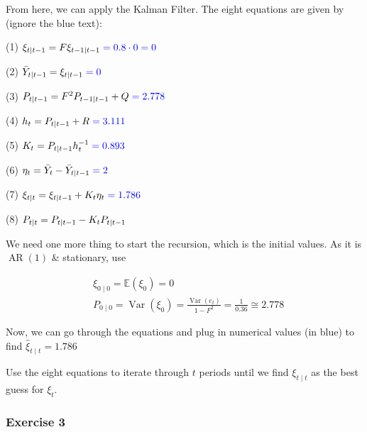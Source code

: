 {{\begin{enumerate}[label=(\alph*)]
{From here, we can apply the Kalman Filter. The eight equations are given by (ignore the blue text):

(1) $\xi_{t \mid t-1}=F \xi_{t-1 \mid t-1} \color{blue} =0.8 \cdot 0=0 \color{black}$

(2) $\bar{Y}_{t \mid t-1}=\xi_{t \mid t-1} \color{blue} =0 \color{black}$

(3) $P_{t \mid t-1}=F^{2} P_{t-1 \mid t-1}+Q \color{blue} =2.778 \color{black}$

(4) $h_{t}=P_{t \mid t-1}+R \color{blue} =3.111 \color{black}$

(5) $K_{t}=P_{t \mid t-1} h_{t}^{-1} \color{blue} =0.893 \color{black}$

(6) $\eta_{t}=\bar{Y}_{t}-\bar{Y}_{t \mid t-1} \color{blue} =2 \color{black}$

(7) $\xi_{t \mid t}=\xi_{t \mid t-1}+K_{t} \eta_{t} \color{blue} =1.786 \color{black}$

(8) $P_{t \mid t}=P_{t \mid t-1}-K_{t} P_{t \mid t-1} \color{blue} \color{black}$

We need one more thing to start the recursion, which is the initial values. As it is $\operatorname{AR}(1)$ \& stationary, use

$$
\begin{aligned}
& \xi_{0\mid 0}=\mathbb{E}\left(\xi_{0}\right)=0 \\
& P_{0\mid 0} = \operatorname{Var}\left(\xi_{0}\right)=\frac{\operatorname{Var}\left(e_{t}\right)}{1-F^{2}}=\frac{1}{0.36} \cong 2.778
\end{aligned}
$$

Now, we can go through the equations and plug in numerical values (in blue) to find $\hat{\xi}_{t\mid t}=1.786$
}
{\item 
Use the eight equations to iterate through $t$ periods until we find $\xi_{t \mid t}$ as the best guess for $\xi_{t}$.
}
\end{enumerate}
}
{
\subsubsection*{Exercise 3}

}}
